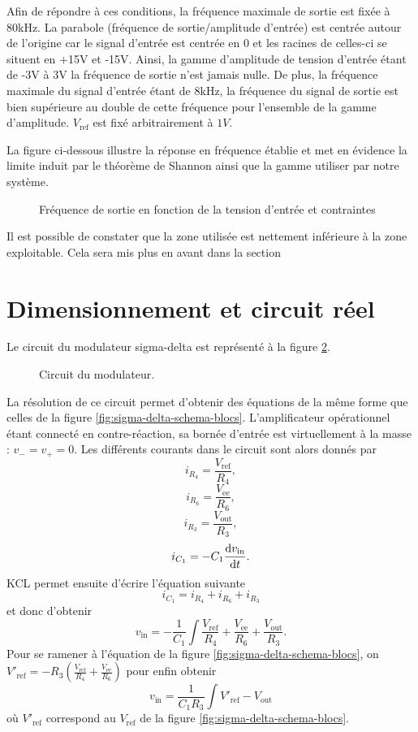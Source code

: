 Afin de répondre à ces conditions, la fréquence maximale de sortie est fixée à 80kHz. La parabole (fréquence de sortie/amplitude d'entrée) est centrée autour de l'origine car le signal d'entrée est centrée en 0 et les racines de celles-ci se situent en +15V et -15V. Ainsi, la gamme d'amplitude de tension d'entrée étant de -3V à 3V la fréquence de sortie n'est jamais nulle. De plus, la fréquence maximale du signal d'entrée étant de 8kHz, la fréquence du signal de sortie est bien supérieure au double de cette fréquence pour l'ensemble de la gamme d'amplitude. $V_{\text{ref}}$ est fixé arbitrairement à $1V$.

La figure ci-dessous illustre la réponse en fréquence établie et met en évidence la limite induit par le théorème de Shannon ainsi que la gamme utiliser par notre système.
\begin{figure}[ht]
	\centering
	\caption{Fréquence de sortie en fonction de la tension d'entrée et contraintes}
	\label{fig:de}
\end{figure}
Il est possible de constater que la zone utilisée est nettement inférieure à la zone exploitable. Cela sera mis plus en avant dans la section %

\section{Dimensionnement et circuit réel}
Le circuit du modulateur sigma-delta est représenté
à la figure \ref{fig:sigma-delta-circuit}.

\begin{figure}[ht]
	\centering
	\caption{Circuit du modulateur.}
	\label{fig:sigma-delta-circuit}
\end{figure}

La résolution de ce circuit permet d'obtenir des équations
de la même forme que celles de la figure
\ref{fig:sigma-delta-schema-blocs}.
L'amplificateur opérationnel étant connecté en contre-réaction,
sa bornée d'entrée est virtuellement à la masse : $v_- = v_+ = 0$.
Les différents courants dans le circuit sont alors donnés par
\[ i_{R_4} = \frac{V_{\text{ref}}}{R_4},\]
\[ i_{R_6} = \frac{V_{\text{ee}}}{R_6},\]
\[ i_{R_3} = \frac{V_{\text{out}}}{R_3},\]
\[ i_{C_1} = -C_1\frac{\operatorname{d}\! v_{\text{in}}}{\operatorname{d}\! t}.\]
KCL permet ensuite d'écrire l'équation suivante
\[ i_{C_1} = i_{R_4} + i_{R_6} + i_{R_3}\]
et donc d'obtenir
\[ v_{\text{in}} = -\frac{1}{C_1}\int \frac{V_{\text{ref}}}{R_4}
+ \frac{V_{\text{ee}}}{R_6} + \frac{V_{\text{out}}}{R_3}.\]
Pour se ramener à l'équation de la figure
\ref{fig:sigma-delta-schema-blocs}, on
$V'_{\text{ref}} = -R_3(\frac{V_{\text{ref}}}{R_4}+\frac{V_{\text{ee}}}{R_6})$
pour enfin obtenir
\[ v_{\text{in}} = \frac{1}{C_1R_3} \int V'_{\text{ref}} - V_{\text{out}}\]
où $V'_{\text{ref}}$ correspond au $V_{\text{ref}}$
de la figure \ref{fig:sigma-delta-schema-blocs}.

